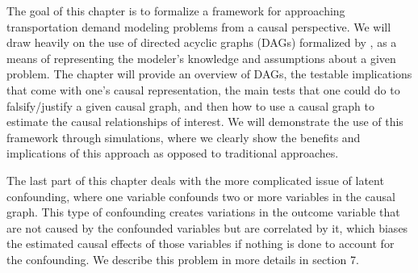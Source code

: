 The goal of this chapter is to formalize a framework for approaching 
transportation demand modeling problems from a causal perspective. We will 
draw heavily on the use of directed acyclic graphs (DAGs) formalized by \citet{pearl_causality_2000}, as a means of representing the modeler's knowledge and assumptions 
about a given problem. The chapter will provide an overview of DAGs, the 
testable implications that come with one's causal representation, the main 
tests that one could do to falsify/justify a given causal graph, and then how 
to use a causal graph to estimate the causal relationships of interest. We 
will demonstrate the use of this framework through simulations, where we 
clearly show the benefits and implications of this approach as opposed to 
traditional approaches. 


The last part of this chapter deals with the more complicated issue of latent 
confounding, where one variable confounds two or more variables in the causal 
graph. This type of confounding creates variations in the outcome variable that are not caused by 
the confounded variables but are correlated by it, which biases the estimated 
causal effects of those variables if nothing is done to account for the 
confounding. We describe this problem in more details in section 7.



